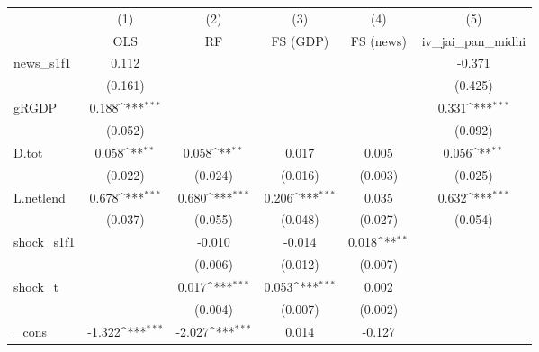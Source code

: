{
\def\sym#1{\ifmmode^{#1}\else\(^{#1}\)\fi}
\begin{tabular}{l*{5}{c}}
\toprule
            &\multicolumn{1}{c}{(1)}&\multicolumn{1}{c}{(2)}&\multicolumn{1}{c}{(3)}&\multicolumn{1}{c}{(4)}&\multicolumn{1}{c}{(5)}\\
            &\multicolumn{1}{c}{OLS}&\multicolumn{1}{c}{RF}&\multicolumn{1}{c}{FS (GDP)}&\multicolumn{1}{c}{FS (news)}&\multicolumn{1}{c}{iv\_jai\_pan\_midhi}\\
\midrule
news\_s1f1   &       0.112         &                     &                     &                     &      -0.371         \\
            &     (0.161)         &                     &                     &                     &     (0.425)         \\
\addlinespace
gRGDP       &       0.188\sym{***}&                     &                     &                     &       0.331\sym{***}\\
            &     (0.052)         &                     &                     &                     &     (0.092)         \\
\addlinespace
D.tot       &       0.058\sym{**} &       0.058\sym{**} &       0.017         &       0.005         &       0.056\sym{**} \\
            &     (0.022)         &     (0.024)         &     (0.016)         &     (0.003)         &     (0.025)         \\
\addlinespace
L.netlend   &       0.678\sym{***}&       0.680\sym{***}&       0.206\sym{***}&       0.035         &       0.632\sym{***}\\
            &     (0.037)         &     (0.055)         &     (0.048)         &     (0.027)         &     (0.054)         \\
\addlinespace
shock\_s1f1  &                     &      -0.010         &      -0.014         &       0.018\sym{**} &                     \\
            &                     &     (0.006)         &     (0.012)         &     (0.007)         &                     \\
\addlinespace
shock\_t     &                     &       0.017\sym{***}&       0.053\sym{***}&       0.002         &                     \\
            &                     &     (0.004)         &     (0.007)         &     (0.002)         &                     \\
\addlinespace
\_cons      &      -1.322\sym{***}&      -2.027\sym{***}&       0.014         &      -0.127         &                     \\

\end{tabular}}
